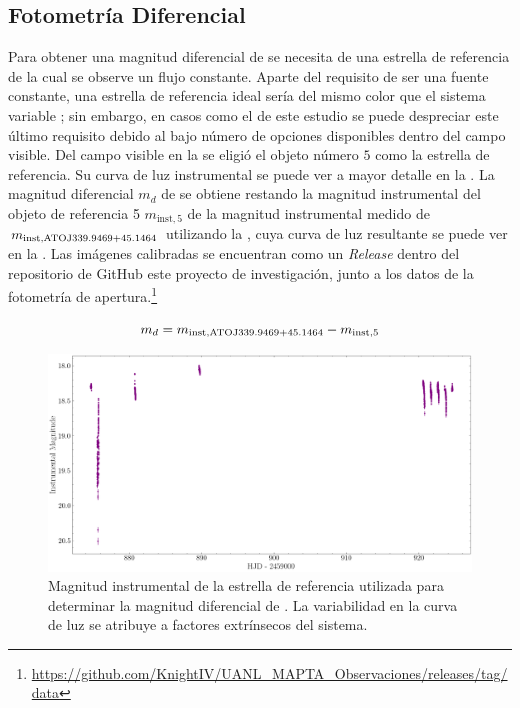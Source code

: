 \subsection{Fotometría Diferencial}
Para obtener una magnitud diferencial de \atoObjId se necesita de una estrella
de referencia de la cual se observe un flujo constante. Aparte del requisito de
ser una fuente constante, una estrella de referencia ideal sería del mismo color
que el sistema variable \atoObjIdNoSpace; sin embargo, en casos como el de este
estudio se puede despreciar este último requisito debido al bajo número de
opciones disponibles dentro del campo visible. Del campo visible en la
 se eligió el objeto número $5$ como la estrella de
referencia. Su curva de luz instrumental se puede ver a mayor detalle en la
. La magnitud diferencial $m_d$
de \atoObjId se obtiene restando la magnitud instrumental del objeto de
referencia 5 $m_{\mathrm{inst, 5}}$ de la magnitud instrumental medido de
\atoObjId $m_{\mathrm{inst, ATO J339.9469+45.1464 \space}}$ utilizando la
, cuya curva de luz resultante se puede
ver en la . Las imágenes calibradas se
encuentran como un \textit{Release} dentro del repositorio de GitHub este
proyecto de investigación, junto a los datos de la fotometría de
apertura.\footnote{\url{https://github.com/KnightIV/UANL_MAPTA_Observaciones/releases/tag/data}}

\begin{eqfloat}[!ht]
	\begin{equation}
		m_d = m_{\mathrm{inst, ATO J339.9469+45.1464 \space}} - m_{\mathrm{inst, 5}}
	\end{equation}
	\blankcaption
	\vspace{-0.5em}
	\label{ecuacionMagnitudDiferencial}
\end{eqfloat}

\begin{figure}[!ht]
	\centering
	\includegraphics[scale=0.39]{Observaciones/Secciones/Figures/Figura Magnitud Instrumental Estrella Referencia.png}
	\caption{Magnitud instrumental de la estrella de referencia utilizada para
	determinar la magnitud diferencial de \atoObjIdNoSpace. La variabilidad en
	la curva de luz se atribuye a factores extrínsecos del sistema.}
	\label{figuraCurvaLuzInstrumentalReferencia}
\end{figure}

